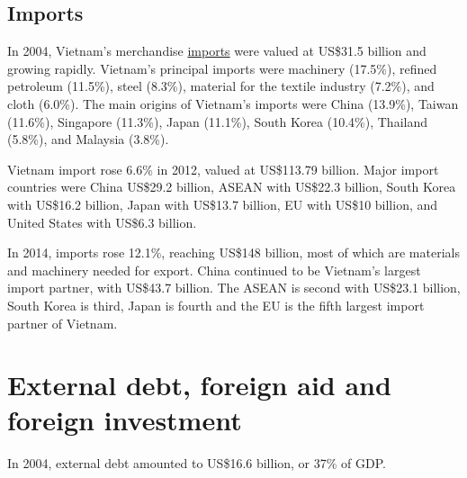 \documentclass[openany]{book}
\begin{document}
\subsection{Imports}

In 2004, Vietnam's merchandise \href{https://en.wikipedia.org/wiki/Import}{imports} were valued at US\$31.5 billion and growing rapidly. Vietnam's principal imports were machinery (17.5\%), refined petroleum (11.5\%), steel (8.3\%), material for the textile industry (7.2\%), and cloth (6.0\%). The main origins of Vietnam's imports were China (13.9\%), Taiwan (11.6\%), Singapore (11.3\%), Japan (11.1\%), South Korea (10.4\%), Thailand (5.8\%), and Malaysia (3.8\%).\cite{36}

Vietnam import rose 6.6\% in 2012, valued at US\$113.79 billion.\cite{108} Major import countries were China US\$29.2 billion, ASEAN with US\$22.3 billion, South Korea with US\$16.2 billion, Japan with US\$13.7 billion, EU with US\$10 billion, and United States with US\$6.3 billion.\cite{118}

In 2014, imports rose 12.1\%, reaching US\$148 billion, most of which are materials and machinery needed for export. China continued to be Vietnam's largest import partner, with US\$43.7 billion. The ASEAN is second with US\$23.1 billion, South Korea is third, Japan is fourth and the EU is the fifth largest import partner of Vietnam.

\section{External debt, foreign aid and foreign investment}

In 2004, external debt amounted to US\$16.6 billion, or 37\% of GDP.\cite{123}\cite{36}
\end{document}
